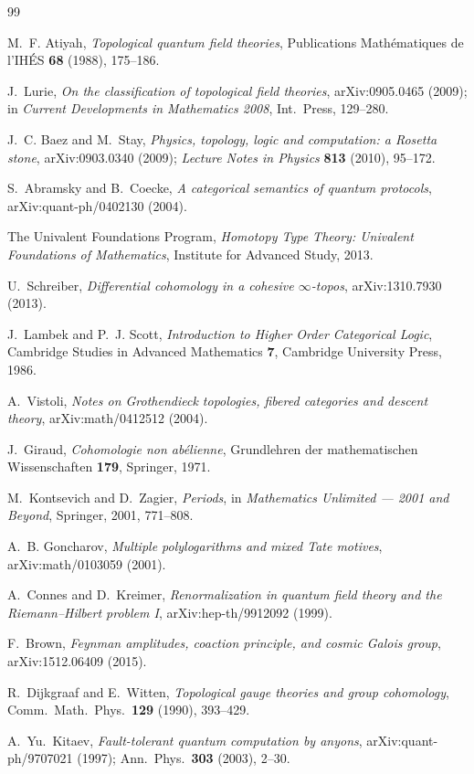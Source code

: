 \documentclass[12pt]{article}
\theoremstyle{definition}
\theoremstyle{remark}
\begin{document}
\begin{thebibliography}{99}
\raggedright

 M.~F. Atiyah, \emph{Topological quantum field theories},
Publications Math\'ematiques de l'IH\'ES \textbf{68} (1988), 175--186.

 J.~Lurie, \emph{On the classification of topological field
theories}, arXiv:0905.0465 (2009); in \emph{Current Developments in Mathematics
2008}, Int.\ Press, 129--280.

 J.~C. Baez and M.~Stay, \emph{Physics, topology, logic and
computation: a Rosetta stone}, arXiv:0903.0340 (2009); \emph{Lecture Notes in
Physics} \textbf{813} (2010), 95--172.

 S.~Abramsky and B.~Coecke, \emph{A categorical
semantics of quantum protocols}, arXiv:quant-ph/0402130 (2004).

 The Univalent Foundations Program, \emph{Homotopy Type
Theory: Univalent Foundations of Mathematics}, Institute for Advanced Study,
2013.

 U.~Schreiber, \emph{Differential cohomology in a cohesive
$\infty$-topos}, arXiv:1310.7930 (2013).

 J.~Lambek and P.~J. Scott, \emph{Introduction to
Higher Order Categorical Logic}, Cambridge Studies in Advanced Mathematics
\textbf{7}, Cambridge University Press, 1986.

 A.~Vistoli, \emph{Notes on Grothendieck topologies,
fibered categories and descent theory}, arXiv:math/0412512 (2004).

 J.~Giraud, \emph{Cohomologie non ab\'elienne}, Grundlehren
der mathematischen Wissenschaften \textbf{179}, Springer, 1971.

 M.~Kontsevich and D.~Zagier, \emph{Periods}, in
\emph{Mathematics Unlimited --- 2001 and Beyond}, Springer, 2001, 771--808.

 A.~B. Goncharov, \emph{Multiple polylogarithms and mixed
Tate motives}, arXiv:math/0103059 (2001).

 A.~Connes and D.~Kreimer, \emph{Renormalization in
quantum field theory and the Riemann--Hilbert problem I}, arXiv:hep-th/9912092
(1999).

 F.~Brown, \emph{Feynman amplitudes, coaction principle,
and cosmic Galois group}, arXiv:1512.06409 (2015).

 R.~Dijkgraaf and E.~Witten, \emph{Topological gauge
theories and group cohomology}, Comm.\ Math.\ Phys.\ \textbf{129} (1990),
393--429.

 A.~Yu.\ Kitaev, \emph{Fault-tolerant quantum computation by
anyons}, arXiv:quant-ph/9707021 (1997); Ann.\ Phys.\ \textbf{303} (2003), 2--30.

\end{thebibliography}
\end{document}
